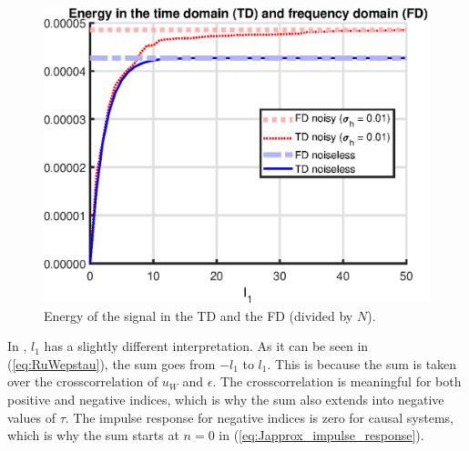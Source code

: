 \begin{figure}[H]
    \centering
    \includegraphics[width = 0.65 \textwidth]{figures/parseval_energy.eps}
    \caption{Energy of the signal in the TD and the FD (divided by $N$).}
    \label{fig:parseval_energy}
\end{figure}

In \cite{Data-driven_model_reference_control}, $l_1$ has a slightly different interpretation. As it can be seen in (\ref{eq:RuWepstau}), the sum goes from $-l_1$ to $l_1$. This is because the sum is taken over the crosscorrelation of $u_W$ and $\epsilon$. The crosscorrelation is meaningful for both positive and negative indices, which is why the sum also extends into negative values of $\tau$. The impulse response for negative indices is zero for causal systems, which is why the sum starts at $n = 0$ in (\ref{eq:Japprox_impulse_response}).

\newpage
